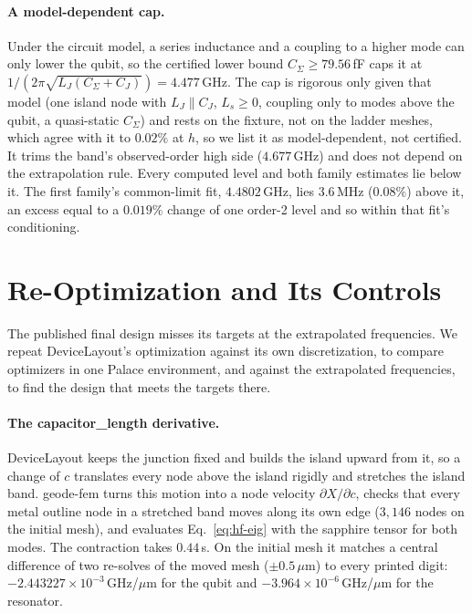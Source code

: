 \documentclass{anvil-paper}
\begin{document}
\paragraph{A model-dependent cap.}
Under the circuit model, a series inductance and a coupling to a higher
mode can only lower the qubit, so the certified lower bound $C_\Sigma \ge
79.56$\,fF caps it at $1/(2\pi\sqrt{L_J(C_\Sigma + C_J)}) = 4.477$\,GHz.
The cap is rigorous only given that model (one island node with $L_J
\parallel C_J$, $L_s \ge 0$, coupling only to modes above the qubit, a
quasi-static $C_\Sigma$) and rests on the fixture, not on the ladder meshes,
which agree with it to $0.02\%$ at $h$, so we list it as model-dependent,
not certified. It trims the band's observed-order high side ($4.677$\,GHz)
and does not depend on the extrapolation rule. Every computed level and both family
estimates lie below it. The first family's common-limit fit, $4.4802$\,GHz,
lies $3.6$\,MHz ($0.08\%$) above it, an excess equal to a $0.019\%$ change
of one order-2 level and so within that fit's conditioning.

\section{Re-Optimization and Its Controls}
\label{sec:reopt}

The published final design misses its targets at the extrapolated
frequencies. We repeat DeviceLayout's optimization against its own
discretization, to compare optimizers in one Palace environment, and
against the extrapolated frequencies, to find the design that meets the
targets there.

\paragraph{The capacitor\_length derivative.}
DeviceLayout keeps the junction fixed and builds the island upward from
it, so a change of $c$ translates every node above the island rigidly and
stretches the island band. geode-fem turns this motion into a node velocity
$\partial X/\partial c$, checks that every metal outline node in a
stretched band moves along its own edge ($3{,}146$ nodes on the initial
mesh), and evaluates Eq.~\eqref{eq:hf-eig} with the sapphire tensor for both modes.
The contraction takes $0.44$\,s. On the initial mesh it matches a central
difference of two re-solves of the moved mesh ($\pm0.5\,\mu$m) to every
printed digit: $-2.443227\times10^{-3}$\,GHz/$\mu$m for the qubit and
$-3.964\times10^{-6}$\,GHz/$\mu$m for the resonator.
\end{document}
